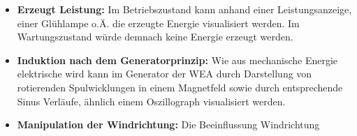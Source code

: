\begin{itemize}
\item \textbf{Erzeugt Leistung:} Im Betriebszustand kann anhand einer Leistungsanzeige, einer Glühlampe o.Ä. die erzeugte Energie visualisiert werden. Im Wartungszustand würde demnach keine Energie erzeugt werden.
 
\item \textbf{Induktion nach dem Generatorprinzip:} Wie aus mechanische Energie elektrische wird kann im Generator der WEA durch Darstellung von rotierenden Spulwicklungen in einem Magnetfeld sowie durch entsprechende Sinus Verläufe, ähnlich einem Oszillograph visualisiert werden.
 
\item \textbf{Manipulation der Windrichtung:} Die Beeinflussung Windrichtung 
 
 
 \end{itemize} 


